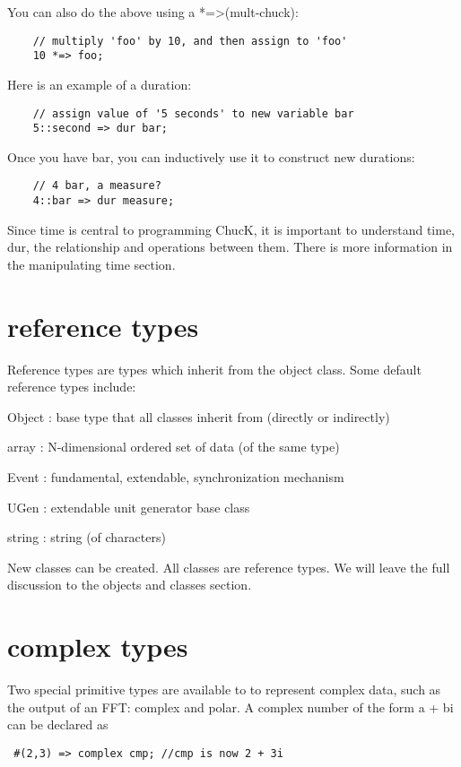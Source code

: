You can also do the above using a *=\textgreater (mult-chuck):
\begin{verbatim}
    // multiply 'foo' by 10, and then assign to 'foo'
    10 *=> foo;
\end{verbatim}

Here is an example of a duration:
\begin{verbatim}
    // assign value of '5 seconds' to new variable bar
    5::second => dur bar;
\end{verbatim}

Once you have bar, you can inductively use it to construct new durations:
\begin{verbatim}
    // 4 bar, a measure?
    4::bar => dur measure;
\end{verbatim}

 Since time is central to programming ChucK, it is important to understand time, dur, the relationship and operations between them. There is more information in the manipulating time section.

\section{reference types}

Reference types are types which inherit from the object class. Some default reference types include:
\begin{chuckitemize}
\item  Object : base type that all classes inherit from (directly or indirectly)
\item  array : N-dimensional ordered set of data (of the same type)
\item  Event : fundamental, extendable, synchronization mechanism
\item  UGen : extendable unit generator base class
\item  string : string (of characters)
\end{chuckitemize}
 New classes can be created. All classes are reference types. We will leave the full discussion to the objects and classes section.

\section{complex types}

Two special primitive types are available to to represent complex data, such as
the output of an FFT: complex and polar. A complex number of the form a + bi can
be declared as
\begin{verbatim}
 #(2,3) => complex cmp; //cmp is now 2 + 3i
\end{verbatim}

